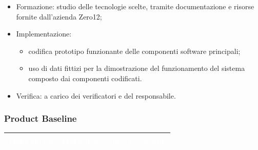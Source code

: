 {{\begin{itemize}
            \begin{itemize}
                \item Formazione: studio delle tecnologie scelte, tramite documentazione e risorse fornite dall'azienda Zero12;
                \item Implementazione: 
                    \begin{itemize}
                        \item codifica prototipo funzionante delle componenti software principali;
                        \item uso di dati fittizi per la dimostrazione del funzionamento del sistema composto dai componenti codificati.
                    \end{itemize}
                \item Verifica: a carico dei verificatori e del responsabile.
            \end{itemize}
    \end{itemize}
    
    \subsubsection{Product Baseline} {
        \setlength{\freewidth}{\dimexpr\textwidth-30\tabcolsep}
        \renewcommand{\arraystretch}{1.0}
        \setlength{\aboverulesep}{0pt}
        \setlength{\belowrulesep}{0pt}
        \begin{longtable}{C{.4\freewidth} C{.4\freewidth}}
        \toprule
        \textcolor{white}{\textbf{Data inizio}}&
        \textcolor{white}{\textbf{Data previsione revisione}} \\
        \toprule
        \endhead
            

\end{longtable}}}}
